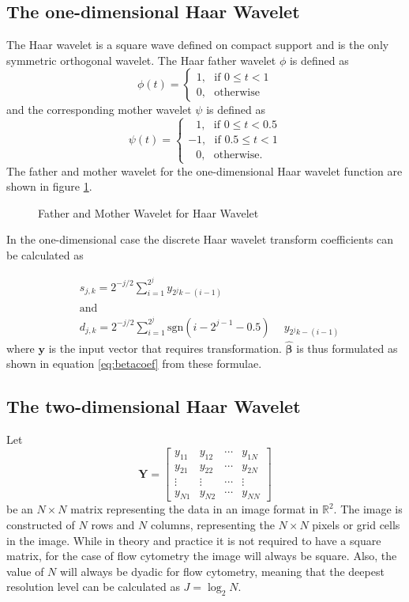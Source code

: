 \documentclass[a4paper, 12pt]{article}
\begin{document}
\subsection{The one-dimensional Haar Wavelet}\label{sec:Haar}
The Haar wavelet is a square wave defined on compact support and is the only symmetric orthogonal wavelet. The Haar father wavelet $\phi$ is defined as 
$$\phi(t) = \begin{cases} 1, \:\:\: \text{if } 0 \leq t < 1\\ 0, \:\:\: \text{otherwise} \end{cases}$$
and the corresponding mother wavelet $\psi$ is defined as
$$\psi(t) = \begin{cases} \phantom{0}\ 1, \:\:\: \text{if } 0 \leq t < 0.5\\ -1, \:\:\: \text{if } 0.5 \leq t < 1\\ \phantom{0}\ 0, \:\:\: \text{otherwise.} \end{cases}$$
The father and mother wavelet for the one-dimensional Haar wavelet function are shown in figure \ref{fig:haar1d}.

\begin{figure}[ht]
\centering

\caption{Father and Mother Wavelet for Haar Wavelet}
\label{fig:haar1d}
\end{figure}


\medskip
In the one-dimensional case the discrete Haar wavelet transform coefficients can be calculated as

\begin{align*}
& s_{j,k} = 2^{-j/2} \sum\limits^{2^{j}}_{i=1} y_{2^{j}k- (i-1)} \\
& \text{and} \\
& d_{j,k} = 2^{-j/2} \sum\limits^{2^{j}}_{i=1} \mathrm{sgn}(i - 2^{j-1} - 0.5) \phantom{-} y_{2^{j}k- (i-1)}
\end{align*}
\noindent
where $\mathbf{y}$ is the input vector that requires transformation. $\hat{\bm{\beta}}$ is thus formulated as shown in equation \ref{eq:betacoef} from these formulae.  

\subsection{The two-dimensional Haar Wavelet}\label{sec:2dHaar}
Let 
$$\mathbf{Y} = \left[ \begin{array}{cccc} 
y_{11} & y_{12} & \cdots & y_{1N} \\
y_{21} & y_{22} & \cdots & y_{2N} \\
\vdots & \vdots & \cdots & \vdots \\
y_{N1} & y_{N2} & \cdots & y_{NN} 
\end{array} \right] 
$$
be an $N \times N$ matrix representing the data in an image format in $\mathbb{R}^2$. The image is constructed of $N$ rows and $N$ columns, representing the $N \times N$ pixels or grid cells in the image. While in theory and practice it is not required to have a square matrix, for the case of flow cytometry the image will always be square. Also, the value of $N$ will always be dyadic for flow cytometry, meaning that the deepest resolution level can be calculated as $J = \log_{2}{N}$.  
\end{document}
